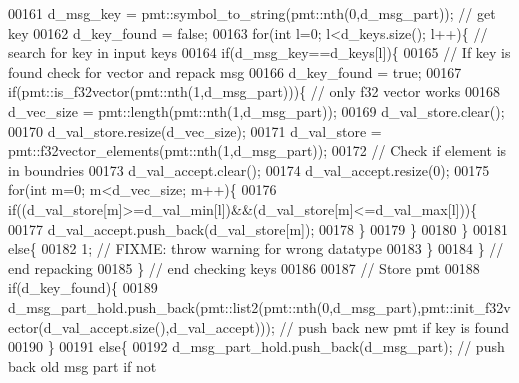 \begin{DoxyCode}
00161 \textcolor{comment}{            d\_msg\_key = pmt::symbol\_to\_string(pmt::nth(0,d\_msg\_part)); // get key}
00162 \textcolor{comment}{            d\_key\_found = false;}
00163 \textcolor{comment}{            for(int l=0; l<d\_keys.size(); l++)\{ // search for key in input keys}
00164 \textcolor{comment}{                if(d\_msg\_key==d\_keys[l])\{}
00165 \textcolor{comment}{                    // If key is found check for vector and repack msg}
00166 \textcolor{comment}{                    d\_key\_found = true;}
00167 \textcolor{comment}{                    if(pmt::is\_f32vector(pmt::nth(1,d\_msg\_part)))\{ // only f32 vector works}
00168 \textcolor{comment}{                        d\_vec\_size = pmt::length(pmt::nth(1,d\_msg\_part));}
00169 \textcolor{comment}{                        d\_val\_store.clear();}
00170 \textcolor{comment}{                        d\_val\_store.resize(d\_vec\_size);}
00171 \textcolor{comment}{                        d\_val\_store = pmt::f32vector\_elements(pmt::nth(1,d\_msg\_part));}
00172 \textcolor{comment}{                        // Check if element is in boundries}
00173 \textcolor{comment}{                        d\_val\_accept.clear();}
00174 \textcolor{comment}{                        d\_val\_accept.resize(0);}
00175 \textcolor{comment}{                        for(int m=0; m<d\_vec\_size; m++)\{}
00176 \textcolor{comment}{                            if((d\_val\_store[m]>=d\_val\_min[l])&&(d\_val\_store[m]<=d\_val\_max[l]))\{}
00177 \textcolor{comment}{                                d\_val\_accept.push\_back(d\_val\_store[m]);}
00178 \textcolor{comment}{                            \}}
00179 \textcolor{comment}{                        \}}
00180 \textcolor{comment}{                    \}}
00181 \textcolor{comment}{                    else\{}
00182 \textcolor{comment}{                        1; // FIXME: throw warning for wrong datatype}
00183 \textcolor{comment}{                    \}}
00184 \textcolor{comment}{                \} // end repacking}
00185 \textcolor{comment}{            \} // end checking keys}
00186 \textcolor{comment}{            }
00187 \textcolor{comment}{            // Store pmt}
00188 \textcolor{comment}{            if(d\_key\_found)\{}
00189 \textcolor{comment}{                
      d\_msg\_part\_hold.push\_back(pmt::list2(pmt::nth(0,d\_msg\_part),pmt::init\_f32vector(d\_val\_accept.size(),d\_val\_accept))); // push back new pmt if key is found}
00190 \textcolor{comment}{            \}}
00191 \textcolor{comment}{            else\{}
00192 \textcolor{comment}{                d\_msg\_part\_hold.push\_back(d\_msg\_part); // push back old msg part if not}

\end{DoxyCode}
